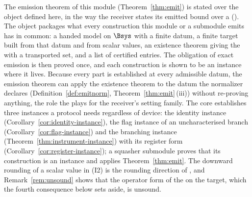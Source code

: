
The emission theorem of this module (Theorem~\ref{thm:emit}) is stated over
the object defined here, in the way the receiver states its emitted bound
over a  (). The object
packages what every construction this module or a submodule emits has in
common: a handed model on $\Bsys$ with a finite datum, a finite target built
from that datum and from scalar values, an existence theorem giving the
 with a transported set, and a list of certified
entries.
The obligation of exact emission is then proved once, and each construction
is shown to be an instance where it lives. Because every part is established
at every admissible datum, the emission theorem can apply the existence
theorem to the datum the normalizer declares
(Definition~\ref{def:emitnorm}, Theorem~\ref{thm:emit}\,(iii)) without
re-proving anything, the role the  plays for the receiver's
setting family. The core establishes three instances a protocol needs
regardless of device: the identity instance
(Corollary~\ref{cor:identity-instance}), the flag instance of an
uncharacterised branch (Corollary~\ref{cor:flag-instance}) and the branching
instance (Theorem~\ref{thm:instrument-instance}) with its register form
(Corollary~\ref{cor:register-instance}); a squasher submodule proves that its
construction is an instance and applies Theorem~\ref{thm:emit}. The downward
rounding of a scalar value in (I2) is the rounding direction of
, and Remark~\ref{rem:unsound} shows
that the operator form of the  on the target, which
the fourth consequence below sets aside, is unsound.

